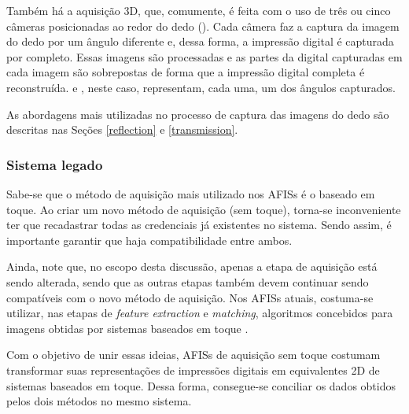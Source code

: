 Também há a aquisição 3D, que, comumente, é feita com o uso de três ou cinco câmeras posicionadas ao redor do dedo (). Cada câmera faz a captura da imagem do dedo por um ângulo diferente e, dessa forma, a impressão digital é capturada por completo. Essas imagens são processadas e as partes da digital capturadas em cada imagem são sobrepostas de forma que a impressão digital completa é reconstruída.  e , neste caso, representam, cada uma, um dos ângulos capturados.

%

%

%

As abordagens mais utilizadas no processo de captura das imagens do dedo são descritas nas Seções \ref{reflection} e \ref{transmission}.

\subsubsection{Sistema legado}
Sabe-se que o método de aquisição mais utilizado nos \acrshort{AFIS}s é o baseado em toque. Ao criar um novo método de aquisição (sem toque), torna-se inconveniente ter que recadastrar todas as credenciais já existentes no sistema. Sendo assim, é importante garantir que haja compatibilidade entre ambos.

Ainda, note que, no escopo desta discussão, apenas a etapa de aquisição está sendo alterada, sendo que as outras etapas também devem continuar sendo compatíveis com o novo método de aquisição. Nos \acrshort{AFIS}s atuais, costuma-se utilizar, nas etapas de \textit{feature extraction} e \textit{matching}, algoritmos concebidos para imagens obtidas por sistemas baseados em toque \cite{advances_biometrics}.

Com o objetivo de unir essas ideias, \acrshort{AFIS}s de aquisição sem toque costumam transformar suas representações de impressões digitais em equivalentes 2D de sistemas baseados em toque. Dessa forma, consegue-se conciliar os dados obtidos pelos dois métodos no mesmo sistema.

